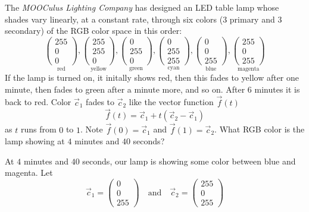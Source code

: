 \documentclass{ximera}
\begin{document}
\begin{example}
  The \textit{MOOCulus Lighting Company} has designed an LED table
  lamp whose shades vary linearly, at a constant rate, through six
  colors ($3$ primary and $3$ secondary) of the RGB color space in
  this order:
    \[
    \underset{\text{red}}{\begin{pmatrix}255\\0\\0\end{pmatrix}},
    \underset{\text{yellow}}{\begin{pmatrix}255\\255\\0\end{pmatrix}},
    \underset{\text{green}}{\begin{pmatrix}0\\255\\0\end{pmatrix}},
    \underset{\text{cyan}}{\begin{pmatrix}0\\255\\255\end{pmatrix}},
    \underset{\text{blue}}{\begin{pmatrix}0\\0\\255\end{pmatrix}},
    \underset{\text{magenta}}{\begin{pmatrix}255\\0\\255\end{pmatrix}}
    \]
  If the lamp is turned on, it initally shows red, then this fades to
  yellow after one minute, then fades to green after a minute more,
  and so on. After $6$ minutes it is back to red. Color $\vec{c}_1$
  fades to $\vec{c}_2$ like the vector function $\vec{f}(t)$
  \[
  \vec{f}(t) = \vec{c}_1+ t(\vec{c}_2 -\vec{c}_1)
  \]
  as $t$ runs from $0$ to $1$. Note $\vec{f}(0) = \vec{c}_1$ and
  $\vec{f}(1) = \vec{c}_2$.  What RGB color is the lamp showing at $4$
  minutes and $40$ seconds?
  \begin{explanation}
    At $4$ minutes and $40$ seconds, our lamp is showing some color
    between blue and magenta. Let
    \[
    \vec{c}_1 = \begin{pmatrix}0\\0\\255\end{pmatrix} \quad\text{and}\quad
      \vec{c}_2 = \begin{pmatrix}255\\0\\255\end{pmatrix}
\]
\end{explanation}
\end{example}
\end{document}
